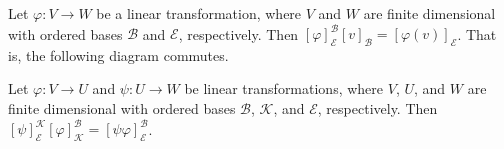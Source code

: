 \documentclass{memoir}
\begin{document}
\begin{prp} \mbox{}
\begin{enumerate*}
\item Let $\varphi : V \rightarrow W$ be a linear transformation, where $V$ and $W$ are finite dimensional with ordered bases $\mathcal{B}$ and $\mathcal{E}$, respectively. Then $[\varphi]^\mathcal{B}_\mathcal{E} [v]_\mathcal{B} = [\varphi(v)]_\mathcal{E}$. That is, the following diagram commutes.
\begin{center}
\end{center}
\item Let $\varphi : V \rightarrow U$ and $\psi : U \rightarrow W$ be linear transformations, where $V$, $U$, and $W$ are finite dimensional with ordered bases $\mathcal{B}$, $\mathcal{K}$, and $\mathcal{E}$, respectively. Then $[\psi]^\mathcal{K}_\mathcal{E} [\varphi]^\mathcal{B}_\mathcal{K} = [\psi\varphi]^\mathcal{B}_\mathcal{E}$.
\end{enumerate*}
\end{prp}
\end{document}
